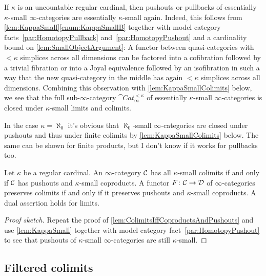 \begin{rem}\label{rem:KappaSmallClosedUnderPushouts}
	If $\kappa$ is an uncountable regular cardinal, then pushouts or pullbacks of essentially $\kappa$-small $\infty$-categories are essentially $\kappa$-small again. Indeed, this follows from \cref{lem:KappaSmall}\cref{enum:KappaSmallB} together with model category facts~\cref{par:HomotopyPullback} and~\cref{par:HomotopyPushout} and a cardinality bound on \cref{lem:SmallObjectArgument}: A functor between quasi-categories with $<\kappa$ simplices across all dimensions can be factored into a cofibration followed by a trivial fibration or into a Joyal equivalence followed by an isofibration in such a way that the new quasi-category in the middle has again $<\kappa$ simplices across all dimensions. Combining this observation with \cref{lem:KappaSmallColimits} below, we see that the full sub-$\infty$-category $\cat{Cat}_\infty^{<\kappa}$ of essentially $\kappa$-small $\infty$-categories is closed under $\kappa$-small limits and colimits.
	
	In the case $\kappa=\aleph_0$ it's obvious that $\aleph_0$-small $\infty$-categories are closed under pushouts and thus under finite colimits by \cref{lem:KappaSmallColimits} below. The same can be shown for finite products, but I don't know if it works for pullbacks too.
\end{rem}
\begin{lem}\label{lem:KappaSmallColimits}
	Let $\kappa$ be a regular cardinal. An $\infty$-category $\mathcal{C}$ has all $\kappa$-small colimits if and only if $\mathcal{C}$ has pushouts and $\kappa$-small coproducts. A functor $F\colon \mathcal{C}\rightarrow\mathcal{D}$ of $\infty$-categories preserves colimits if and only if it preserves pushouts and $\kappa$-small coproducts. A dual assertion holds for limits.
\end{lem}
\begin{proof}[Proof sketch]
	Repeat the proof of \cref{lem:ColimitsIffCoproductsAndPushouts} and use \cref{lem:KappaSmall} together with model category fact~\cref{par:HomotopyPushout} to see that pushouts of $\kappa$-small $\infty$-categories are still $\kappa$-small.
\end{proof}
\subsection{Filtered colimits}

